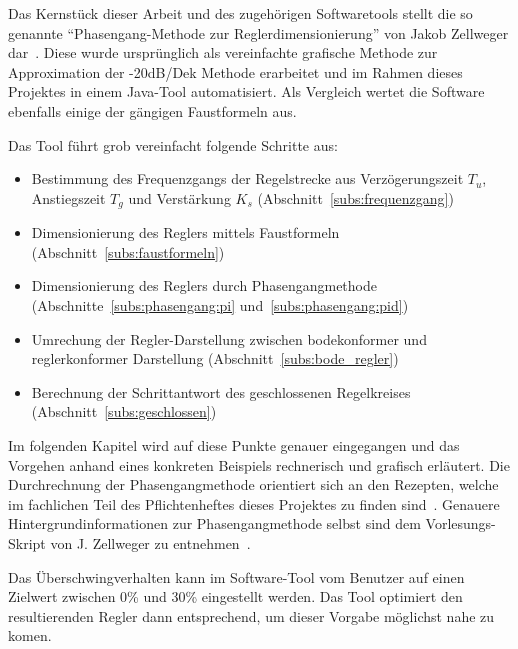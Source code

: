 Das  Kernst\"uck  dieser Arbeit  und  des  zugeh\"origen Softwaretools  stellt
die   so  genannte   ``Phasengang-Methode   zur  Reglerdimensionierung''   von
Jakob   Zellweger   dar~\cite{regelungstechnik:zellweger_short}. Diese   wurde
urspr\"unglich  als  vereinfachte  grafische  Methode  zur  Approximation  der
-20dB/Dek Methode erarbeitet und im Rahmen dieses Projektes in einem Java-Tool
automatisiert. Als  Vergleich   wertet  die  Software  ebenfalls   einige  der
g\"angigen Faustformeln aus.

Das Tool f\"uhrt grob vereinfacht folgende Schritte aus:
\begin{itemize}
    \item
        Bestimmung des  Frequenzgangs der Regelstrecke  aus Verz\"ogerungszeit
        $T_u$,     Anstiegszeit     $T_g$      und     Verst\"arkung     $K_s$
        (Abschnitt~\ref{subs:frequenzgang})
    \item
        Dimensionierung       des      Reglers       mittels      Faustformeln
        (Abschnitt~\ref{subs:faustformeln})
    \item
        Dimensionierung      des      Reglers     durch      Phasengangmethode
        (Abschnitte~\ref{subs:phasengang:pi} und~\ref{subs:phasengang:pid})
    \item
        Umrechung   der   Regler-Darstellung    zwischen   bodekonformer   und
        reglerkonformer Darstellung (Abschnitt~\ref{subs:bode_regler})
    \item
        Berechnung   der   Schrittantwort   des   geschlossenen   Regelkreises
        (Abschnitt~\ref{subs:geschlossen})
\end{itemize}

Im  folgenden   Kapitel  wird  auf   diese  Punkte  genauer   eingegangen  und
das  Vorgehen  anhand  eines  konkreten  Beispiels  rechnerisch  und  grafisch
erl\"autert. Die Durchrechnung  der Phasengangmethode  orientiert sich  an den
Rezepten, welche  im fachlichen Teil  des Pflichtenheftes dieses  Projektes zu
finden  sind~\cite{ref:pflichtenheft}. Genauere  Hintergrundinformationen  zur
Phasengangmethode  selbst  sind  dem  Vorlesungs-Skript  von  J. Zellweger  zu
entnehmen~\cite{regelungstechnik:zellweger_short}.

Das  \"Uberschwingverhalten  kann  im  Software-Tool vom  Benutzer  auf  einen
Zielwert  zwischen 0\%  und 30\%  eingestellt werden. Das  Tool optimiert  den
resultierenden Regler dann entsprechend, um dieser Vorgabe m\"oglichst nahe zu
komen.

